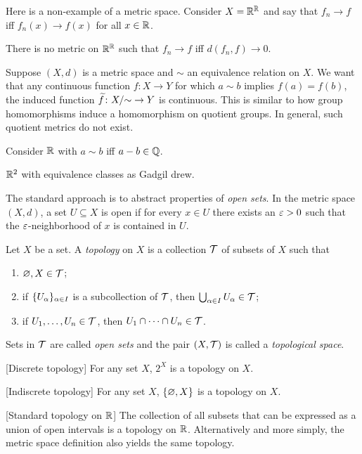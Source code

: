 Here is a non-example of a metric space.
Consider $X = \mathbb{R}^{\mathbb{R}}$ and say that $f_n \to f$ iff $f_n(x) \to f(x)$ for all
$x \in \mathbb{R}$.
\begin{claim} \label{thm:non-metric}
    There is no metric on $\mathbb{R}^{\mathbb{R}}$ such that $f_n \to f$ iff
    $d(f_n, f) \to 0$.
\end{claim}

Suppose $(X, d)$ is a metric space and $\sim$ an equivalence relation on
$X$.
We want that any continuous function $f\colon X \to Y$ for which
$a \sim b$ implies $f(a) = f(b)$, the induced function
$\widetilde{f}\colon X/{\sim} \to Y$ is continuous.
This is similar to how group homomorphisms induce a homomorphism on quotient
groups.
In general, such quotient metrics do not exist.
\begin{examples}
    \item Consider $\mathbb{R}$ with $a \sim b$ iff $a - b \in \mathbb{Q}$.
    \item $\mathbb{R}^2$ with equivalence classes as Gadgil drew.
\end{examples}

The standard approach is to abstract properties of \emph{open sets}.
In the metric space $(X, d)$, a set $U \subseteq X$ is open if for every
$x \in U$ there exists an $\varepsilon > 0$ such that the $\varepsilon$-neighborhood
of $x$ is contained in $U$.
\begin{definition} \label{def:topo}
    Let $X$ be a set.
    A \emph{topology} on $X$ is a collection $\mathcal{T}$ of subsets of $X$ such
    that
    \begin{enumerate}
        \item $\varnothing, X \in \mathcal{T}$;
        \item if $\{U_\alpha\}_{\alpha \in I}$ is a subcollection of
            $\mathcal{T}$, then $\bigcup_{\alpha \in I} U_\alpha \in \mathcal{T}$;
        \item if $U_1, \dots, U_n \in \mathcal{T}$, then $U_1 \cap \dots \cap U_n \in \mathcal{T}$.
    \end{enumerate}
    Sets in $\mathcal{T}$ are called \emph{open sets} and the pair $(X, \mathcal{T})$ is
    called a \emph{topological space}.
\end{definition}
\begin{examples}
    \item{} [Discrete topology] For any set $X$, $2^X$ is a topology on $X$.
    \item{} [Indiscrete topology] For any set $X$,
        $\{\varnothing, X\}$ is a topology on $X$.
    \item{} [Standard topology on $\mathbb{R}$] The collection of all
        subsets that can be expressed as a union of open intervals
        is a topology on $\mathbb{R}$.
        Alternatively and more simply, the metric space definition also
        yields the same topology.
\end{examples}
